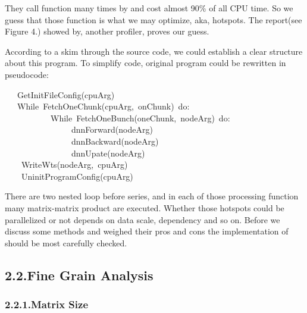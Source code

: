 \documentclass{article}
\begin{document}
\noindent{}They call  function  many times by  and 
cost almost 90\% of all CPU time. So we guess that those function
 is what we may optimize, aka, hotspots.
The report(see Figure 4.) showed by, another profiler, proves our guess.%

According to a skim through the source code, we could establish a clear structure about this program. To simplify code, original program could be rewritten in pseudocode:%
\begin{mdpre}%
\noindent~~~{GetInitFileConfig}(cpuArg)\\
~~~{While}~{FetchOneChunk}(cpuArg,~onChunk)~{do}:\\
~~~~~~~~~~~{While}~{FetchOneBunch}(oneChunk,~nodeArg)~{do}:\\
~~~~~~~~~~~~~~~~dnnForward(nodeArg)\\
~~~~~~~~~~~~~~~~dnnBackward(nodeArg)\\
~~~~~~~~~~~~~~~~dnnUpate(nodeArg)\\
~~~~{WriteWts}(nodeArg,~cpuArg)\\
~~~~{UninitProgramConfig}(cpuArg)\\
\end{mdpre}\noindent{}There are two nested loop before  series, and 
in each of those processing function many matrix-matrix product are
executed. Whether those hotspots could be parallelized or not depends
on data scale, dependency and so on. Before we discuss some methods and weighed their pros and cons the implementation of  should be most carefully checked.

\subsection{2.2.\hspace*{0.5em}Fine Grain Analysis}\label{sec-fine-grain-analysis}%

\subsubsection{2.2.1.\hspace*{0.5em}Matrix Size}\label{sec-matrix-size}%
\end{document}
